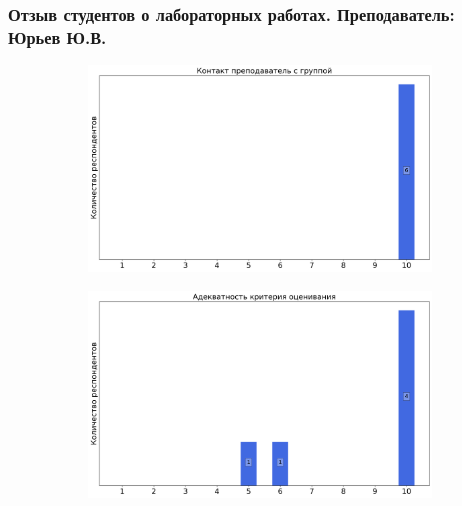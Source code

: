         \subsubsection{Отзыв студентов о лабораторных работах. Преподаватель: Юрьев Ю.В.}
            \begin{figure}[H]
                \centering
                \begin{subfigure}[b]{0.45\textwidth}
                    \centering
                    \includegraphics[width=\textwidth]{images/3 course/Общая физика - квантовая физика/labniks-marks-Юрьев Ю.В.-0.png}
                \end{subfigure}
                \begin{subfigure}[b]{0.45\textwidth}
                    \centering
                    \includegraphics[width=\textwidth]{images/3 course/Общая физика - квантовая физика/labniks-marks-Юрьев Ю.В.-1.png}
                \end{subfigure}
                \begin{subfigure}[b]{0.45\textwidth}

\end{subfigure}
\end{figure}
